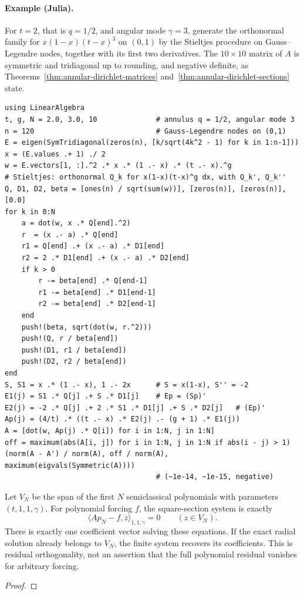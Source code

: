 \paragraph{Example (Julia).} For $t=2$, that is $q=1/2$, and angular mode
$\gamma=3$, generate the orthonormal family for $x(1-x)(t-x)^3$ on $(0,1)$ by
the Stieltjes procedure on Gauss--Legendre nodes, together with its first two
derivatives. The $10\times10$ matrix of $A$ is symmetric and tridiagonal up to
rounding, and negative definite, as
Theorems~\ref{thm:annular-dirichlet-matrices}
and~\ref{thm:annular-dirichlet-sections} state.
\begin{verbatim}
using LinearAlgebra
t, g, N = 2.0, 3.0, 10              # annulus q = 1/2, angular mode 3
n = 120                             # Gauss-Legendre nodes on (0,1)
E = eigen(SymTridiagonal(zeros(n), [k/sqrt(4k^2 - 1) for k in 1:n-1]))
x = (E.values .+ 1) ./ 2
w = E.vectors[1, :].^2 .* x .* (1 .- x) .* (t .- x).^g
# Stieltjes: orthonormal Q_k for x(1-x)(t-x)^g dx, with Q_k', Q_k''
Q, D1, D2, beta = [ones(n) / sqrt(sum(w))], [zeros(n)], [zeros(n)], [0.0]
for k in 0:N
    a = dot(w, x .* Q[end].^2)
    r  = (x .- a) .* Q[end]
    r1 = Q[end] .+ (x .- a) .* D1[end]
    r2 = 2 .* D1[end] .+ (x .- a) .* D2[end]
    if k > 0
        r -= beta[end] .* Q[end-1]
        r1 -= beta[end] .* D1[end-1]
        r2 -= beta[end] .* D2[end-1]
    end
    push!(beta, sqrt(dot(w, r.^2)))
    push!(Q, r / beta[end])
    push!(D1, r1 / beta[end])
    push!(D2, r2 / beta[end])
end
S, S1 = x .* (1 .- x), 1 .- 2x      # S = x(1-x), S'' = -2
E1(j) = S1 .* Q[j] .+ S .* D1[j]    # Ep = (Sp)'
E2(j) = -2 .* Q[j] .+ 2 .* S1 .* D1[j] .+ S .* D2[j]   # (Ep)'
Ap(j) = (4/t) .* ((t .- x) .* E2(j) .- (g + 1) .* E1(j))
A = [dot(w, Ap(j) .* Q[i]) for i in 1:N, j in 1:N]
off = maximum(abs(A[i, j]) for i in 1:N, j in 1:N if abs(i - j) > 1)
(norm(A - A') / norm(A), off / norm(A), maximum(eigvals(Symmetric(A))))
                                    # (~1e-14, ~1e-15, negative)
\end{verbatim}

\begin{theorem}
\label{thm:annular-polynomial-galerkin}
\leanok
Let $V_N$ be the span of the first $N$ semiclassical polynomials with parameters
$(t,1,1,\gamma)$. For polynomial forcing $f$, the square-section system is exactly
\[
 \langle Ap_N-f,z\rangle_{1,1,\gamma}=0\qquad(z\in V_N).
\]
There is exactly one coefficient vector solving these equations. If the exact
radial solution already belongs to $V_N$, the finite system recovers its coefficients.
This is residual orthogonality, not an assertion that the full polynomial
residual vanishes for arbitrary forcing.
\end{theorem}
\begin{proof}
\leanok
\end{proof}

